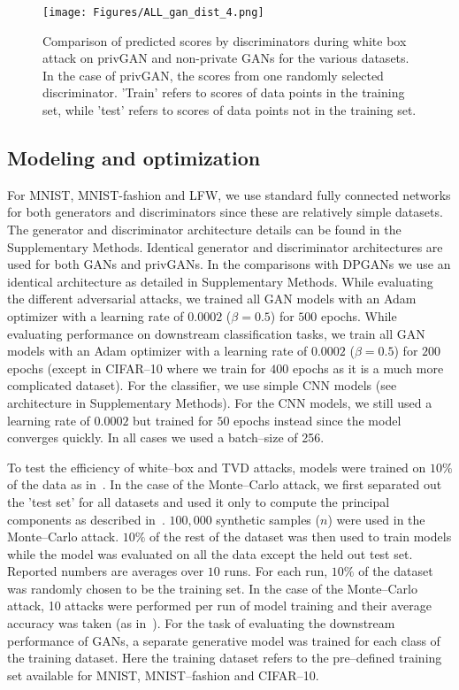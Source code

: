 \documentclass{article}
\begin{document}
\begin{figure}[!htb]
    \centering
    \texttt{[image: Figures/ALL\_gan\_dist\_4.png]}
    \caption{Comparison of predicted scores by discriminators during white box attack on privGAN and non-private GANs for the various datasets. In the case of privGAN, the scores from one randomly selected discriminator. 'Train' refers to scores of data points in the training set, while 'test' refers to scores of data points not in the training set. }
    \label{pv-loss-1}
\end{figure}


\subsection{Modeling and optimization}
For MNIST, MNIST-fashion and LFW, we use standard fully connected networks for both generators and discriminators since these are relatively simple datasets. The generator and discriminator architecture details can be found in the Supplementary Methods. Identical generator and discriminator architectures are used for both GANs and privGANs. In the comparisons with DPGANs we use an identical architecture as detailed in Supplementary Methods. While evaluating the different adversarial attacks, we trained all GAN models with an Adam~\cite{kingma2014adam} optimizer with a learning rate of $0.0002$ ($\beta = 0.5$) for $500$ epochs. While evaluating performance on downstream classification tasks, we train all GAN models with an Adam optimizer with a learning rate of $0.0002$ ($\beta = 0.5$) for $200$ epochs (except in CIFAR--10 where we train for $400$ epochs as it is a much more complicated dataset). For the classifier, we use simple CNN models (see architecture in Supplementary Methods). For the CNN models, we still used a learning rate of $0.0002$ but trained for $50$ epochs instead since the model converges quickly. In all cases we used a batch--size of 256.  

To test the efficiency of white--box  and TVD attacks, models were trained on $10\%$ of the data as in~\cite{hayes2019logan}. In the case of the Monte--Carlo attack, we first separated out the 'test set' for all datasets and used it only to compute the principal components as described in~\cite{hilprecht2019monte}. $100,000$ synthetic samples ($n$) were used in the Monte--Carlo attack. $10\%$ of the rest of the dataset was then used to train models while the model was evaluated on all the data except the held out test set. Reported numbers are averages over $10$ runs. For each run, $10\%$ of the dataset was randomly chosen to be the training set. In the case of the Monte--Carlo attack, 10 attacks were performed per run of model training and their average accuracy was taken (as in~\cite{hilprecht2019monte}). For the task of evaluating the downstream performance of GANs, a separate generative model was trained for each class of the training dataset. Here the training dataset refers to the pre--defined training set available for MNIST, MNIST--fashion and CIFAR--10.
\end{document}
